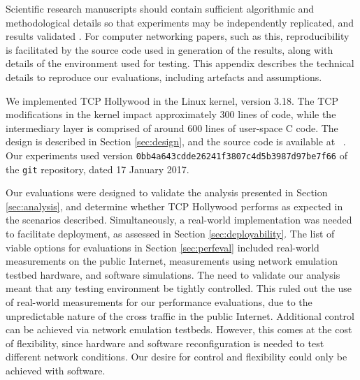 

Scientific research manuscripts should contain sufficient algorithmic and methodological details so that
experiments may be independently replicated, and results validated \cite{munafo:2017:manifesto}. 
For computer networking papers, such as this, reproducibility is facilitated by the source code used in generation of
the results, along with details of the environment used for
testing. This appendix describes the technical details
to reproduce our evaluations, including artefacts and assumptions.


We implemented TCP Hollywood in the Linux kernel, version 3.18. The TCP
modifications in the kernel impact approximately 300 lines of code, while
the intermediary layer is comprised of around 600 lines of user-space C
code. The design is described in Section \ref{sec:design}, and the source
code is available at ~\cite{hollywood-src}.
Our experiments used version \texttt{0bb4a643cdde26241f3807c4d5b3987d97be7f66}
of the \texttt{git} repository, dated 17 January 2017.

Our evaluations were designed to validate the analysis presented in Section \ref{sec:analysis}, and
determine whether TCP Hollywood performs as expected in the scenarios described. Simultaneously, a real-world implementation was needed to facilitate deployment,
as assessed in Section \ref{sec:deployability}.
The list of viable options for evaluations in Section \ref{sec:perfeval}
included real-world measurements on the public Internet, measurements using
network emulation testbed hardware, and software simulations. The need to
validate our analysis meant that any testing environment be tightly controlled.
This ruled out the use of real-world measurements for our performance
evaluations, due to the unpredictable nature of the cross traffic in the public
Internet. Additional control can be achieved via network emulation testbeds.
However, this comes at the cost of flexibility, since hardware and software
reconfiguration is needed to test different network conditions. Our desire for
control and flexibility could only be achieved with software.

